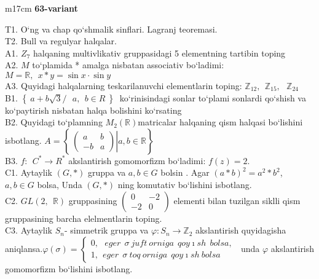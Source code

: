 \documentclass{article}
\begin{document}
\begin{tabular}{m{17cm}}
\textbf{63-variant}
\newline

T1. O`ng va chap qo`shmalik sinflari. Lagranj teoremasi. \\
T2. Bull va regulyar halqalar. \\
A1. \(Z_{7}\) halqaning multivlikativ gruppasidagi 5 elementning tartibin toping \\
A2. \(M\) to`plamida * amalga nisbatan associativ bo`ladimi: \(M\mathbb{= R},\ \ x*y = \sin x \cdot \sin y\) \\
A3. Quyidagi halqalarning teskarilanuvchi elementlarin toping: \(\mathbb{Z}_{12},\ \ \mathbb{Z}_{15},\ \ \ \mathbb{Z}_{24}\) \\
B1. \(\left\{ \left. \ a + b\sqrt{3}/\ \ \ a,\ \ b \in R\  \right\} \right.\ \) ko`rinisindagi sonlar to`plami sonlardi qo`shish va ko`paytirish nisbatan halqa bolishini ko`rsating \\
B2. Quyidagi to`plamning \(M_{2}(\mathbb{R})\)matricalar halqaning qism halqasi bo`lishini isbotlang. \(A = \left\{ \left. \ \begin{pmatrix}
a & b \\
 - b & a
\end{pmatrix} \right|a,b\mathbb{\in R} \right\}\) \\
B3. \(f:\ \ C^{*} \rightarrow R^{*}\) akslantirish gomomorfizm bo`ladimi: \(f(z) = 2.\) \\
C1. Aytaylik \((G,*)\) gruppa va \(a,b \in G\) bo\textquotesingle lsin . Agar \((a*b)^{2} = a^{2}*b^{2}\), \(a,b \in G\) bolsa, Unda \((G,*)\) ning komutativ bo`lishini isbotlang. \\
C2. \(GL(2,\mathbb{\ \ R})\) gruppasining \(\begin{pmatrix}
0 & - 2 \\
 - 2 & 0
\end{pmatrix}\) elementi bilan tuzilgan siklli qism gruppasining barcha elelmentlarin toping. \\
C3. Aytaylik \(S_{n}\)- simmetrik gruppa va \(\varphi:S_{n} \rightarrow \mathbb{Z}_{2}\) akslantirish quyidagisha aniqlansa.\(\varphi(\sigma) = \left\{ \begin{matrix}
0,\ \ \ eger\ \ \sigma\ juft\ orniga\ \ qoy\imath sh\ \ bolsa, \\
1,\ \ eger\ \ \sigma\ toq\ orniga\ \ qoy\imath sh\ bolsa
\end{matrix} \right.\ \) unda \(\varphi\) akslantirish gomomorfizm bo`lishini isbotlang. \\

\end{tabular}
\vspace{1cm}
\end{document}
